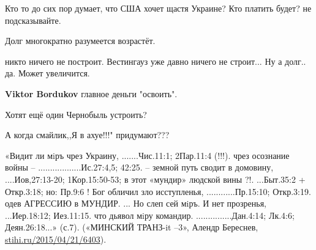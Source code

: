 \begin{itemize}
 
Кто то до сих пор думает, что США хочет щастя Украине? Кто платить будет? не подсказывайте.

 
Долг многократно разумеется возрастёт.

 
никто ничего не построит. Вестингауз уже давно ничего не строит... Ну а долг.. да. Может увеличится.

\begin{itemize}

 
\textbf{Viktor Bordukov} главное деньги "освоить".

 
Хотят ещё один Чернобыль устроить?
\end{itemize}

 
А когда
смайлик,,Я в ахуе!!!" придумают???


«Видит ли мiръ чрез Украину, .......Чис.11:1; 2Пар.11:4 (!!!).
чрез осознание войны – ..................Ис.27:4,5; 42:25.
– земной путь сводит в домовину, ....Иов,27:13-20; 1Кор.15:50-53;
в этот «мундир» людской вины ?!. ...Быт.35:2 + Откр.3:18; но: Пр.9:6 !
Бог обличил зло исступленья, ............Пр.15:10; Откр.3:19.
одев АГРЕССИЮ в МУНДИР.
... Но слеп сей мiръ. И нет прозренья, ...Иер.18:12; Иез.11:15.
что дьявол мiру командир. ...............Дан.4:14; Лк.4:6; Деян.26:18...» (с.7).
(«МИНСКИЙ ТРАНЗ-it –3», Алендр Береснев, \url{stihi.ru/2015/04/21/6403}).


\end{itemize}
